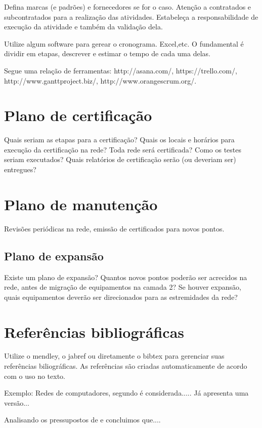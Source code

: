 \documentclass[	DIV=calc,%
							paper=a4,%
							fontsize=12pt,%
							onecolumn]{scrartcl}	 					%
\begin{document}
Defina marcas (e padrões) e fornecedores se for o caso. Atenção a contratados e subcontratados para a realização das atividades. Estabeleça a responsabilidade de execução da atividade e também da validação dela.

Utilize algum software para gerear o cronograma. Excel,etc. O fundamental é dividir em etapas, descrever e estimar o tempo de cada uma delas.

Segue uma relação de ferramentas:
http://asana.com/, 
https://trello.com/, 
http://www.ganttproject.biz/, 
http://www.orangescrum.org/. 

\section{Plano de certificação}
Quais seriam as etapas para a certificação? 
Quais os locais e horários para execução da certificação na rede? Toda rede será certificada?
Como os testes seriam executados?
Quais relatórios de certificação serão (ou deveriam ser) entregues? 

\section{Plano de manutenção}
Revisões periódicas na rede, emissão de certificados para novos pontos.

\subsection{Plano de expansão}
Existe um plano de expansão? Quantos novos pontos poderão ser acrecidos na rede, antes de migração de equipamentos na camada 2? Se houver expansão, quais equipamentos deverão ser direcionados para as estremidades da rede? 


\section{Referências bibliográficas}
Utilize o mendley, o jabref ou diretamente o bibtex para gerenciar suas referências biliográficas. As referências são criadas automaticamente de acordo com o uso no texto.

Exemplo: Redes de computadores, segundo \cite{t2013} é considerada..... Já \cite{kurose2010} apresenta uma versão...

Analisando os pressupostos de \cite{ref3} e \cite{ref4} concluimos que....


\renewcommand\refname{} %

  
\end{document}
